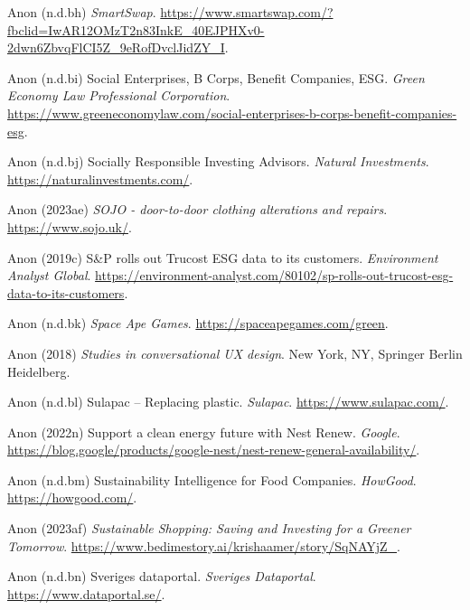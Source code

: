 \documentclass[
  letterpaper,
  DIV=11,
  numbers=noendperiod]{scrartcl}
\newlength{\cslhangindent}
\newenvironment{CSLReferences}[2] %
 {\begin{list}{}{%
  \setlength{\itemindent}{0pt}
  \setlength{\leftmargin}{0pt}
  \setlength{\parsep}{0pt}
  \ifodd #1
   \setlength{\leftmargin}{\cslhangindent}
   \setlength{\itemindent}{-1\cslhangindent}
  \fi
  \setlength{\itemsep}{#2\baselineskip}}}
 {\end{list}}
\begin{document}
\begin{CSLReferences}{0}{1}
Anon (n.d.bh) \emph{{SmartSwap}}.
\url{https://www.smartswap.com/?fbclid=IwAR12OMzT2n83InkE_40EJPHXv0-2dwn6ZbvqFlCI5Z_9eRofDvclJidZY_I}.

Anon (n.d.bi) Social {Enterprises}, {B Corps}, {Benefit Companies},
{ESG}. \emph{Green Economy Law Professional Corporation}.
\url{https://www.greeneconomylaw.com/social-enterprises-b-corps-benefit-companies-esg}.

Anon (n.d.bj) Socially {Responsible Investing Advisors}. \emph{Natural
Investments}. \url{https://naturalinvestments.com/}.

Anon (2023ae) \emph{{SOJO} - door-to-door clothing alterations and
repairs}. \url{https://www.sojo.uk/}.

Anon (2019c) S\&{P} rolls out {Trucost ESG} data to its customers.
\emph{Environment Analyst Global}.
\url{https://environment-analyst.com/80102/sp-rolls-out-trucost-esg-data-to-its-customers}.

Anon (n.d.bk) \emph{Space {Ape Games}}.
\url{https://spaceapegames.com/green}.

Anon (2018) \emph{Studies in conversational {UX} design}. New York, NY,
Springer Berlin Heidelberg.

Anon (n.d.bl) Sulapac -- {Replacing} plastic. \emph{Sulapac}.
\url{https://www.sulapac.com/}.

Anon (2022n) Support a clean energy future with {Nest Renew}.
\emph{Google}.
\url{https://blog.google/products/google-nest/nest-renew-general-availability/}.

Anon (n.d.bm) Sustainability {Intelligence} for {Food Companies}.
\emph{HowGood}. \url{https://howgood.com/}.

Anon (2023af) \emph{Sustainable {Shopping}: {Saving} and {Investing} for
a {Greener Tomorrow}}.
\url{https://www.bedimestory.ai/krishaamer/story/SqNAYjZ_}.

Anon (n.d.bn) Sveriges dataportal. \emph{Sveriges Dataportal}.
\url{https://www.dataportal.se/}.


\end{CSLReferences}
\end{document}
